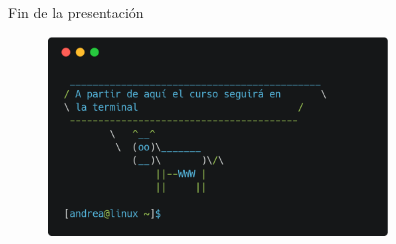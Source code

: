 \documentclass{beamer}
\begin{document}
    \begin{frame}{Fin de la presentación}
        \begin{figure}[ht!]
          \centering
          \includegraphics[width=90mm]{terminal.eps}
        \end{figure}
    \end{frame}  
\end{document}
